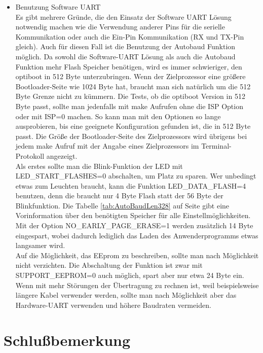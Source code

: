 \begin{itemize}
\item{Benutzung Software UART} \\
Es gibt mehrere Gründe, die den Einsatz der Software UART Lösung notwendig machen wie die Verwendung anderer
Pins für die serielle Kommunikation oder auch die Ein-Pin Kommunikation (RX und TX-Pin gleich).
Auch für diesen Fall ist die Benutzung der Autobaud Funktion möglich. Da sowohl die Software-UART Lösung
als auch die Autobaud Funktion mehr Flash Speicher benötigen, wird es immer schwieriger, den optiboot
in 512 Byte unterzubringen. Wenn der Zielprozessor eine größere Bootloader-Seite wie 1024 Byte hat,
braucht man sich natürlich um die 512 Byte Grenze nicht zu kümmern.
Die Tests, ob die optiboot Version in 512 Byte passt, sollte man jedenfalls mit make Aufrufen
ohne die ISP Option oder mit ISP=0 machen. So kann man mit den Optionen so lange
ausprobieren, bis eine geeignete Konfiguration gefunden ist, die in 512 Byte passt.
Die Größe der Bootloader-Seite des Zielprozessors wird übrigens bei jedem make Aufruf mit
der Angabe eines Zielprozessors im Terminal-Protokoll angezeigt.\\
Als erstes sollte man die Blink-Funktion der LED mit LED\_START\_FLASHES=0 abschalten, um Platz zu sparen.
Wer unbedingt etwas zum Leuchten braucht, kann die Funktion LED\_DATA\_FLASH=4 benutzen,
denn die braucht nur 4 Byte Flash statt der 56 Byte der Blinkfunktion.
Die Tabelle \ref{tab:AutoBaudLen328} auf Seite \pageref{tab:AutoBaudLen328} gibt
eine Vorinformation über den benötigten Speicher für alle Einstellmöglichkeiten.\\
Mit der Option NO\_EARLY\_PAGE\_ERASE=1 werden zusätzlich 14 Byte eingespart,
wobei dadurch lediglich das Laden des Anwenderprogramms etwas langsamer wird.\\
Auf die Möglichkeit, das EEprom zu beschreiben, sollte man nach Möglichkeit nicht verzichten.
Die Abschaltung der Funktion ist zwar mit SUPPORT\_EEPROM=0 auch möglich, spart aber nur etwa 24 Byte ein.\\

Wenn mit mehr Störungen der Übertragung zu rechnen ist, weil beispielsweise längere Kabel
verwender werden, sollte man nach Möglichkeit aber das Hardware-UART verwenden und höhere Baudraten
vermeiden.


\end{itemize}

\section{Schlußbemerkung}

